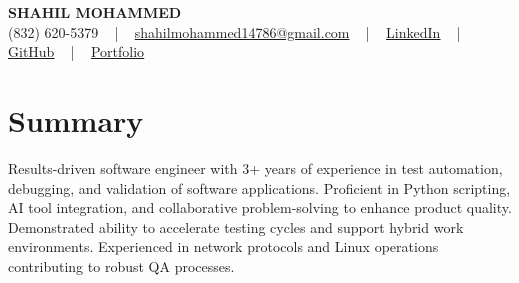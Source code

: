 \documentclass[letterpaper,10pt]{article}
\begin{document}
\begin{center}
    {\fontsize{14pt}{12pt}\selectfont \textbf{\MakeUppercase{Shahil Mohammed}}}\\ \vspace{2pt}
    \fontsize{10pt}{12pt}\selectfont (832) 620-5379 ~ | ~ \href{mailto:shahilmohammed14786@gmail.com}{shahilmohammed14786@gmail.com} ~ | ~  
    \href{https://www.linkedin.com/in/shahil-mohammed-9652931a1/}{\color{blue}\underline{LinkedIn}}  ~ | ~ 
    \href{https://github.com/freakbeast14}{\color{blue}\underline{GitHub}} ~ | ~ 
    \href{https://shahil-mohammed.netlify.app/}{\color{blue}\underline{Portfolio}}
    \vspace{-8pt}
\end{center}

\section{Summary}
\vspace{-2pt}\fontsize{8pt}{9pt}\selectfont
Results-driven software engineer with 3+ years of experience in test automation, debugging, and validation of software applications. Proficient in Python scripting, AI tool integration, and collaborative problem-solving to enhance product quality. Demonstrated ability to accelerate testing cycles and support hybrid work environments. Experienced in network protocols and Linux operations contributing to robust QA processes.
 \vspace{-5pt}
 
\vspace{-2pt}
\end{document}
